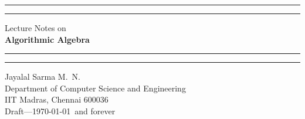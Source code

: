 \documentclass[12pt]{report}
\author{}
\begin{document}
\thispagestyle{empty}

\begin{flushright}

\vspace*{3cm}
\makeatletter 
{}\p@ 
\hrule height 2pt
\p@
\hrule height 1pt

{\huge Lecture Notes on}\\[3ex]
{\Huge \textbf{Algorithmic Algebra}} \\[2ex]

\end{flushright}

\makeatletter 
{}\p@ 
\hrule height 2pt
\p@
\hrule height 1pt
\p@
\makeatother


\begin{flushleft}
{\large Jayalal Sarma M.~N.\\ 
Department of Computer Science and Engineering\\
IIT Madras, Chennai 600036 \\[2ex]
Draft---\today\ and forever
}
\end{flushleft}

\newpage
\setcounter{page}{1}


\newpage
\listofscribe          %

\newpage
\listofinstr

\newpage
\tableofcontents

\newpage 
\newpage \setcounter{page}{1} 

\newpage \setcounter{section}{0}

\newpage \setcounter{section}{0}

\newpage \setcounter{section}{0}

\newpage \setcounter{section}{0}

\newpage \setcounter{section}{0}

\newpage \setcounter{section}{0}

\newpage \setcounter{section}{0}

\newpage \setcounter{section}{0}

\newpage \setcounter{section}{0}

\newpage \setcounter{section}{0}

\newpage \setcounter{section}{0}

\newpage \setcounter{section}{0}

\newpage \setcounter{section}{0}

\newpage \setcounter{section}{0}

\newpage \setcounter{section}{0}

\newpage \setcounter{section}{0}

\newpage \setcounter{section}{0}

\newpage \setcounter{section}{0}

\newpage \setcounter{section}{0}

\end{document}
